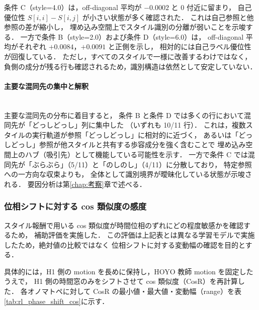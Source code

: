 条件 C（style=4.0）は，off-diagonal 平均が $-0.0002$ と 0 付近に留まり，
自己優位性 $S[i,i]-S[i,j]$ が小さい状態が多く確認された．
これは自己参照と他参照の差が縮小し，
埋め込み空間上でスタイル識別の分離が弱いことを示唆する．
一方で条件 B（style=2.0）および条件 D（style=6.0）は，
off-diagonal 平均がそれぞれ $+0.0084$，$+0.0091$ と正側を示し，
相対的には自己ラベル優位性が回復している．
ただし，すべてのスタイルで一様に改善するわけではなく，
負側の成分が残る行も確認されるため，識別構造は依然として安定していない．

\paragraph{主要な混同先の集中と解釈}\mbox{}\\

主要な混同先の分布に着目すると，
条件 B と条件 D では多くの行において混同先が「どっしどっし」列に集中した
（いずれも 10/11 行）．
これは，複数スタイルの実行軌道が参照「どっしどっし」に相対的に近づく，
あるいは「どっしどっし」参照が他スタイルと共有する歩容成分を強く含むことで
埋め込み空間上のハブ（吸引先）として機能している可能性を示す．
一方で条件 C では混同先が「ぶらぶら」（5/11）と「のしのし」（4/11）に分散しており，
特定参照への一方向な収束よりも，
全体として識別境界が曖昧化している状態が示唆される．
要因分析は第\ref{chap:考察}章で述べる．

\subsubsection{位相シフトに対する cos 類似度の感度}
\label{subsubsec:rl_results_phase_shift}

スタイル報酬で用いる cos 類似度が時間位相のずれにどの程度敏感かを確認するため，
補助評価を実施した．
この評価は上記表とは異なる学習モデルで実施したため，絶対値の比較ではなく
位相シフトに対する変動幅の確認を目的とする．

具体的には，H1 側の motion を長めに保持し，HOYO 教師 motion を固定したうえで，
H1 側の時間窓のみをシフトさせて cos 類似度（CosR）を再計算した．
各オノマトペに対して CosR の最小値・最大値・変動幅（range）を表\ref{tab:rl_phase_shift_cos}に示す．

